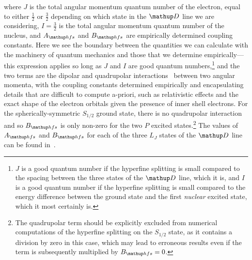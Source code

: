 where $J$ is the total angular momentum quantum number of the electron, equal to either $\frac12$ or $\frac32$ depending on which state in the $\up{D}$ line we are considering, $I=\frac32$ is the total angular momentum quantum number of the nucleus, and $A_\up{hfs}$ and $B_\up{hfs}$ are empirically determined coupling constants. Here we see the boundary between the quantities we can calculate with the machinery of quantum mechanics and those that we determine empirically---this expression applies so long as $J$ and $I$ are good quantum numbers,\footnote{$J$ is a good quantum number if the hyperfine splitting is small compared to the spacing between the three states of the $\up{D}$ line, which it is, and $I$ is a good quantum number if the hyperfine splitting is small compared to the energy difference between the ground state and the first \emph{nuclear} excited state, which it most certainly is.} and the two terms are the dipolar and quadrupolar interactions~\cite{arimondo_experimental_1977} between two angular momenta, with the coupling constants determined empirically and encapsulating details that are difficult to compute a-priori, such as relativistic effects and the exact shape of the electron orbitals given the presence of inner shell electrons. For the spherically-symmetric $S_{1/2}$ ground state, there is no quadrupolar interaction and so $B_\up{hfs}$ is only non-zero for the two $P$ excited states.\footnote{The quadrupolar term should be explicitly excluded from numerical computations of the hyperfine splitting on the $S_{1/2}$ state, as it contains a division by zero in this case, which may lead to erroneous results even if the term is subsequently multiplied by $B_\up{hfs}=0$.} The values of $A_\up{hfs}$ and $B_\up{hfs}$ for each of the three $L_J$ states of the $\up{D}$ line can be found in~\cite{steck_rubidium_2015}.

